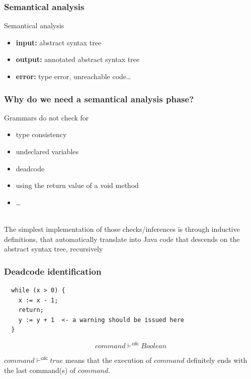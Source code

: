 \documentclass[11pt]{beamer}  %
\begin{document}
\begin{frame}
\frametitle{Semantical analysis}

\begin{center}
\begin{redbox}{Semantical analysis}
\begin{itemize}
\item \textbf{input:} abstract syntax tree
\item \textbf{output:} annotated abstract syntax tree
\item \textbf{error:} type error, unreachable code\ldots
\end{itemize}
\end{redbox}
\end{center}

\end{frame}

\begin{frame}\frametitle{Why do we need a semantical analysis phase?}

\begin{greenbox}{}
Grammars do not check for
%
\begin{itemize}
\item type consistency
\item undeclared variables
\item deadcode
\item using the return value of a void method
\item \ldots
\end{itemize}
%
\end{greenbox}

\mbox{}\\

The simplest implementation of those checks/inferences is through inductive
definitions, that automatically translate into Java code that
descends on the abstract syntax tree, recursively

\end{frame}

\newcommand{\cdc}{\vdash^{\mathsf{cdc}}}

\begin{frame}[fragile]\frametitle{Deadcode identification}

\begin{verbatim}
  while (x > 0) {
    x := x - 1;
    return;
    y := y + 1  <- a warning should be issued here
  }
\end{verbatim}

\[
  \boxed{command\cdc Boolean}
\]

$command\cdc true$ means that the execution of
$command$ definitely ends with the last command(s) of $command$.
\end{frame}
\end{document}
